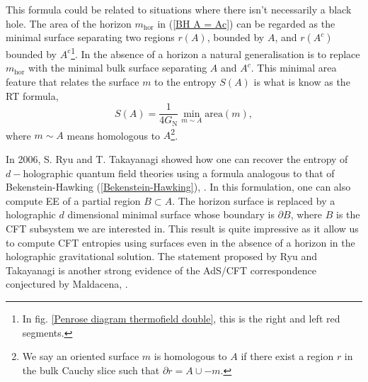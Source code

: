 This formula could be related to situations where there isn't necessarily a black hole. The area of the horizon $m_\text{hor}$ in (\ref{BH A = Ac}) can be regarded as the minimal surface separating two regions $r(A)$, bounded by $A$, and $r(A^c)$ bounded by $A^c$\footnote{In fig. \ref{Penrose diagram thermofield double}, this is the right and left red segments.}. In the absence of a horizon a natural generalisation is to replace $m_\text{hor}$ with the minimal bulk surface separating $A$ and $A^c$. This minimal area feature that relates the surface $m$ to the entropy $S(A)$ is what is know as the RT formula,
\begin{equation}\label{RT}
    S\left(A\right)= \frac{1}{4G_\text{N}}\min_{m\sim A}\text{area}\left(m\right),
\end{equation}
where $m\sim A$ means homologous to $A$\footnote{We say an oriented surface $m$ is homologous to $A$ if there exist a region $r$ in the bulk Cauchy slice such that $\partial r = A\cup -m$.}.

In 2006, S. Ryu and T. Takayanagi showed how one can recover the entropy of $d-$holographic quantum field theories using a formula analogous to that of Bekenstein-Hawking (\ref{Bekenstein-Hawking}), \cite{Ryu}. In this formulation, one can also compute EE of a partial region $B\subset A$. The horizon surface is replaced by a holographic $d$ dimensional minimal surface whose boundary is $\partial B$, where $B$ is the CFT subsystem we are interested in. This result is quite impressive as it allow us to compute CFT entropies using surfaces even in the absence of a horizon in the holographic gravitational solution. The statement proposed by Ryu and Takayanagi is another strong evidence of the AdS/CFT correspondence conjectured by Maldacena, \cite{Maldacena_1999}.

